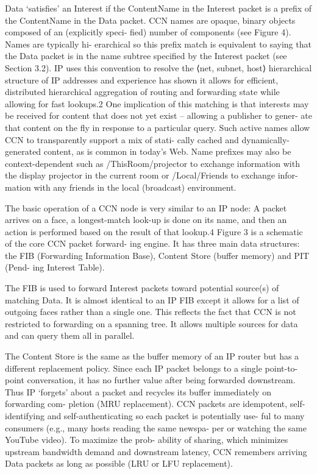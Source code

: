 \par
Data ‘satisfies’ an Interest if the ContentName in the Interest packet is a prefix of the ContentName in the Data packet. CCN names are opaque, binary objects composed of an (explicitly speci- fied) number of components (see Figure 4). Names are typically hi- erarchical so this prefix match is equivalent to saying that the Data packet is in the name subtree specified by the Interest packet (see Section 3.2). IP uses this convention to resolve the ⟨net, subnet, host⟩ hierarchical structure of IP addresses and experience has shown it allows for efficient, distributed hierarchical aggregation of routing and forwarding state while allowing for fast lookups.2 One implication of this matching is that interests may be received for content that does not yet exist – allowing a publisher to gener- ate that content on the fly in response to a particular query. Such active names allow CCN to transparently support a mix of stati- cally cached and dynamically-generated content, as is common in today’s Web. Name prefixes may also be context-dependent such as /ThisRoom/projector to exchange information with the display projector in the current room or /Local/Friends to exchange infor- mation with any friends in the local (broadcast) environment.
\par
The basic operation of a CCN node is very similar to an IP node: A packet arrives on a face, a longest-match look-up is done on its name, and then an action is performed based on the result of that lookup.4 Figure 3 is a schematic of the core CCN packet forward- ing engine. It has three main data structures: the FIB (Forwarding Information Base), Content Store (buffer memory) and PIT (Pend- ing Interest Table).
\par
The FIB is used to forward Interest packets toward potential source(s) of matching Data. It is almost identical to an IP FIB except it allows for a list of outgoing faces rather than a single one. This reflects the fact that CCN is not restricted to forwarding on a spanning tree. It allows multiple sources for data and can query them all in parallel.
\par
The Content Store is the same as the buffer memory of an IP router but has a different replacement policy. Since each IP packet belongs to a single point-to-point conversation, it has no further value after being forwarded downstream. Thus IP ‘forgets’ about a packet and recycles its buffer immediately on forwarding com- pletion (MRU replacement). CCN packets are idempotent, self- identifying and self-authenticating so each packet is potentially use- ful to many consumers (e.g., many hosts reading the same newspa- per or watching the same YouTube video). To maximize the prob- ability of sharing, which minimizes upstream bandwidth demand and downstream latency, CCN remembers arriving Data packets as long as possible (LRU or LFU replacement).
